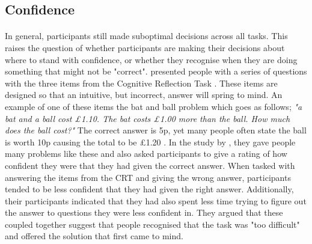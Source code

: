 \documentclass[12pt]{article}
\begin{document}
\subsection*{Confidence}
\paragraph{} In general, participants still made suboptimal decisions across all tasks. This raises the question of whether participants are making their decisions about where to stand with confidence, or whether they recognise when they are doing something that might not be "correct". \cite{SZOLLOSI20171} presented people with a series of questions with the three items from the Cognitive Reflection Task \citep[CRT: ][]{Frederick2005CRT}. These items are designed so that an intuitive, but incorrect, answer will spring to mind. An example of one of these items the bat and ball problem which goes as follows; \textit{"a bat and a ball cost \pounds1.10. The bat costs \pounds1.00 more than the ball. How much does the ball cost?"} The correct answer is 5p, yet many people often state the ball is worth 10p causing the total to be \pounds1.20 \citep{Frederick2005CRT}. In the study by \cite{SZOLLOSI20171}, they gave people many problems like these and also asked participants to give a rating of how confident they were that they had given the correct answer. When tasked with answering the items from the CRT and giving the wrong answer, participants tended to be less confident that they had given the right answer. Additionally, their participants indicated that they had also spent less time trying to figure out the answer to questions they were less confident in. They argued that these coupled together suggest that people recognised that the task was "too difficult" and offered the solution that first came to mind. 
\end{document}
